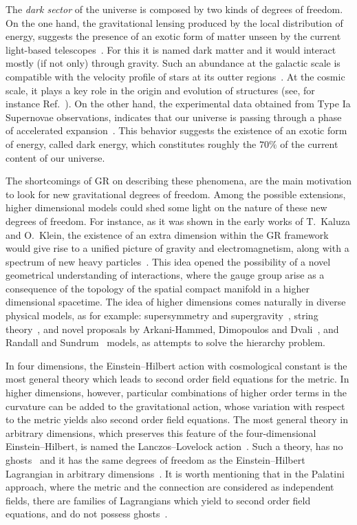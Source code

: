 \documentclass[aps,prd,12pt,superscriptaddress,showpacs,showkeys,longbibliography,reprint,nofootinbib]{revtex4-1}
\begin{document}
The \emph{dark sector} of the universe is composed by two kinds of degrees of freedom. On the one hand, the gravitational lensing produced by the local distribution of energy, suggests the presence of an exotic form of matter unseen by the current light-based telescopes~\cite{Wittman:2000tc}. For this it is named dark matter and it would interact mostly (if not only) through gravity. Such an abundance at the galactic scale is compatible with the velocity profile of stars at its outter regions~\cite{Sofue:2000jx}. At the cosmic scale, it plays a key role in the origin and evolution of structures (see, for instance Ref.~\cite{DelPopolo:2008mr}). On the other hand, the experimental data obtained from Type Ia Supernovae observations, indicates that our universe is passing through a phase of accelerated expansion~\cite{Riess:1998cb}. This behavior suggests the existence of an exotic form of energy, called dark energy, which constitutes roughly the $70\%$ of the current content of our universe.  

The shortcomings of GR on describing these phenomena, are the main motivation to look for new gravitational degrees of freedom. Among the possible extensions, higher dimensional models could shed some light on the nature of these new degrees of freedom. For instance, as it was shown in the early works of T.~Kaluza and O.~Klein, the existence of an extra dimension within the GR framework would give rise to a unified picture of gravity and electromagnetism, along with a spectrum of new heavy particles~\cite{Kaluza:1921tu,*Klein:1926tv}. This idea opened the possibility of a novel geometrical understanding of interactions, where the gauge group arise as a consequence of the topology of the spatial compact manifold in a higher dimensional spacetime. The idea of higher dimensions comes naturally in diverse physical models, as for example: supersymmetry and supergravity~\cite{supergravity}, string theory~\cite{Green:1987sp,*Green:1987mn}, and novel proposals by Arkani-Hammed, Dimopoulos and Dvali~\cite{ArkaniHamed:1998rs,*Antoniadis:1998ig}, and Randall and Sundrum~\cite{Randall:1999ee,*Randall:1999vf} models, as attempts to solve the hierarchy problem.

In four dimensions, the Einstein--Hilbert action with cosmological
constant is the most general theory which leads to second order field
equations for the metric. In higher dimensions, however, particular
combinations of higher order terms in the curvature can be added to
the gravitational action, whose variation with respect to the metric
yields also second order field equations. The most general theory in
arbitrary dimensions, which preserves this feature of the
four-dimensional Einstein--Hilbert, is named the Lanczos--Lovelock
action~\cite{Lanczos:1938sf,*Lovelock:1971yv}. Such a theory, has no
ghosts~\cite{Zumino:1985dp} and it has the same degrees of freedom as
the Einstein--Hilbert Lagrangian in arbitrary
dimensions~\cite{Henneaux:1990au}. It is worth mentioning that in the
Palatini approach, where the metric and the connection are considered
as independent fields, there are families of Lagrangians which yield
to second order field equations, and do not possess
ghosts~\cite{Olmo:2011uz}.
\end{document}
